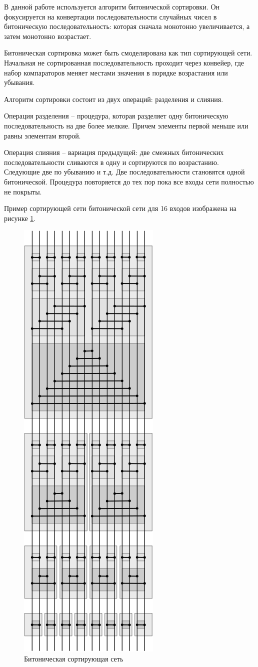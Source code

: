 В данной работе используется алгоритм битонической сортировки. Он фокусируется на конвертации
последовательности случайных чисел в битоническую последовательность: которая сначала
монотонно увеличивается, а затем монотонно возрастает.

Битоническая сортировка может быть смоделирована как тип сортирующей сети. Начальная
не сортированная последовательность проходит через конвейер, где набор компараторов 
меняет местами значения в порядке возрастания или убывания.

Алгоритм сортировки состоит из двух операций: разделения и слияния.

Операция разделения -- процедура, которая разделяет одну битоническую последовательность на
две более мелкие. Причем элементы первой меньше или равны элементам второй.

Операция слияния -- вариация предыдущей: две смежных битонических последовательности
сливаются в одну и сортируются по возрастанию. Следующие две по убыванию и т.д. 
Две последовательности становятся одной битонической. Процедура повторяется до тех пор пока 
все входы сети полностью не покрыты. 

Пример сортирующей сети битонической сети для 16 входов изображена на рисунке \ref{fig:bitonic}.

\begin{figure}
\begin{center}
  \includegraphics[scale=0.7]{Figures/bitonic}
\end{center}
\caption{Битоническая сортирующая сеть}
\label{fig:bitonic}
\end{figure}

